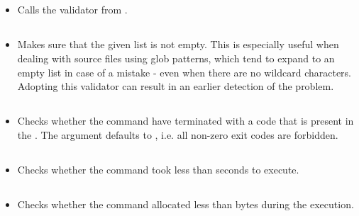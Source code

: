 \subsection*{}\label{subsec:ProgramExistsPrerequisite}
\begin{itemize}[label={}]
    \item Calls the  validator from
          \hyperref[sec:Validators]{}.
\end{itemize}

\subsection*{}\label{subsec:NonEmptyListPrerequisite}
\begin{itemize}[label={}]
    \item Makes sure that the given list is not empty.
          This is especially useful when dealing with source files using glob patterns, which tend to expand to an empty
          list in case of a mistake - even when there are no wildcard characters.
          Adopting this validator can result in an earlier detection of the problem.
\end{itemize}

\subsection*{}\label{subsec:ExitCodePostcondition}
\begin{itemize}[label={}]
    \item Checks whether the command have terminated with a code that is present in the .
          The argument defaults to \python{[0]}, i.e. all non-zero exit codes are forbidden.
\end{itemize}

\subsection*{}\label{subsec:UsedTimePostcondition}
\begin{itemize}[label={}]
    \item Checks whether the command took less than  seconds to execute.
\end{itemize}

\subsection*{}\label{subsec:UsedMemoryPostcondition}
\begin{itemize}[label={}]
    \item Checks whether the command allocated less than  bytes during the execution.
\end{itemize}


